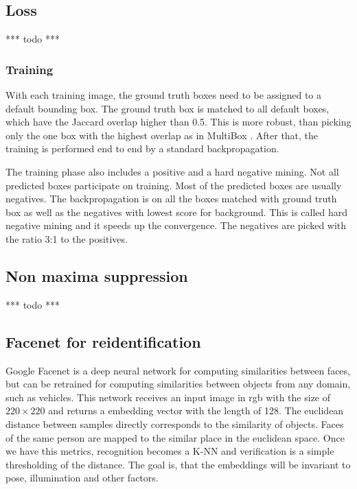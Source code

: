 \documentclass[a4paper,12pt,titlepage]{article}
\numberwithin{figure}{section}
\begin{document}
\subsection{Loss}
*** todo ***

\subsubsection{Training}
With each training image, the ground truth boxes need to be assigned to a default bounding box. The ground truth box is matched to all default boxes, which have the Jaccard overlap higher than 0.5. This is more robust, than picking only the one box with the highest overlap as in MultiBox \cite{erhan2014scalable}. After that, the training is performed end to end by a standard backpropagation. 

The training phase also includes a positive and a hard negative mining. Not all predicted boxes participate on training. Most of the predicted boxes are usually negatives. The backpropagation is on all the boxes matched with ground truth box as well as the negatives with lowest score for background. This is called hard negative mining and it speeds up the convergence. The negatives are picked with the ratio 3:1 to the positives.

\subsection{Non maxima suppression}
*** todo ***


\subsection{Facenet for reidentification}
\label{sec:facenet}
Google Facenet \cite{schroff2015facenet} is a deep neural network for computing similarities between faces, but can be retrained for computing similarities between objects from any domain, such as vehicles. This network  receives an input image in rgb with the size of $220 \times 220$ and returns a embedding vector with the length of 128. The euclidean distance between samples directly corresponds to the similarity of objects. Faces of the same person are mapped to the similar place in the euclidean space. Once we have this metrics, recognition becomes a K-NN and verification is a simple thresholding of the distance. The goal is, that the embeddings will be invariant to pose, illumination and other factors.
\end{document}
